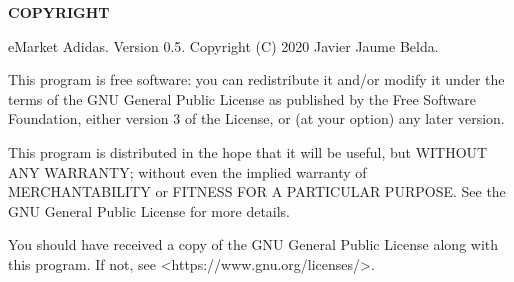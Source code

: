 {\bfseries C\+O\+P\+Y\+R\+I\+G\+HT} \begin{DoxyVerb}eMarket Adidas. Version 0.5.
Copyright (C) 2020  Javier Jaume Belda.

This program is free software: you can redistribute it and/or modify
it under the terms of the GNU General Public License as published by
the Free Software Foundation, either version 3 of the License, or
(at your option) any later version.

This program is distributed in the hope that it will be useful,
but WITHOUT ANY WARRANTY; without even the implied warranty of
MERCHANTABILITY or FITNESS FOR A PARTICULAR PURPOSE.  See the
GNU General Public License for more details.

You should have received a copy of the GNU General Public License
along with this program.  If not, see <https://www.gnu.org/licenses/>.\end{DoxyVerb}
 